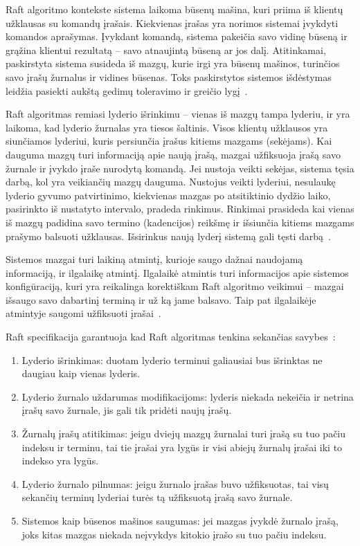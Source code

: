 \documentclass{VUMIFPSkursinis}
\begin{document}
Raft algoritmo kontekste sistema laikoma būsenų mašina, kuri priima iš klientų užklausas su komandų įrašais. Kiekvienas įrašas yra norimos sistemai įvykdyti komandos aprašymas. Įvykdant komandą, sistema pakeičia savo vidinę būseną ir grąžina klientui rezultatą -- savo atnaujintą būseną ar jos dalį. Atitinkamai, paskirstyta sistema susideda iš mazgų, kurie irgi yra būsenų mašinos, turinčios savo įrašų žurnalus ir vidines būsenas. Toks paskirstytos sistemos išdėstymas leidžia pasiekti aukštą gedimų toleravimo ir greičio lygį~\cite{ongaro_consensus, steen_distributed_2017}.

Raft algoritmas remiasi lyderio išrinkimu -- vienas iš mazgų tampa lyderiu, ir yra laikoma, kad lyderio žurnalas yra tiesos šaltinis. Visos klientų užklausos yra siunčiamos lyderiui, kuris persiunčia įrašus kitiems mazgams (sekėjams). Kai dauguma mazgų turi informaciją apie naują įrašą, mazgai užfiksuoja įrašą savo žurnale ir įvykdo įraše nurodytą komandą. Jei nustoja veikti sekėjas, sistema tęsia darbą, kol yra veikiančių mazgų dauguma. Nustojus veikti lyderiui, nesulaukę lyderio gyvumo patvirtinimo, kiekvienas mazgas po atsitiktinio dydžio laiko, pasirinkto iš nustatyto intervalo,  pradeda rinkimus. Rinkimai prasideda kai vienas iš mazgų padidina savo termino (kadencijos) reikšmę ir išsiunčia kitiems mazgams prašymo balsuoti užklausas. Išsirinkus naują lyderį sistemą gali tęsti darbą~\cite{ongaro_consensus}. 

Sistemos mazgai turi laikiną atmintį, kurioje saugo dažnai naudojamą informaciją, ir ilgalaikę atmintį. Ilgalaikė atmintis turi informacijos apie sistemos konfigūraciją, kuri yra reikalinga korektiškam Raft algoritmo veikimui -- mazgai išsaugo savo dabartinį terminą ir už ką jame balsavo. Taip pat ilgalaikėje atmintyje saugomi užfiksuoti įrašai~\cite{ongaro_consensus}.

Raft specifikacija garantuoja kad Raft algoritmas tenkina sekančias savybes~\cite{ongaro_consensus}: 

\begin{enumerate}
\item Lyderio išrinkimas: duotam lyderio terminui galiausiai bus išrinktas ne daugiau kaip vienas lyderis.
\item Lyderio žurnalo uždarumas modifikacijoms: lyderis niekada nekeičia ir netrina įrašų savo žurnale, jis gali tik pridėti naujų įrašų.
\item Žurnalų įrašų atitikimas: jeigu dviejų mazgų žurnalai turi įrašą su tuo pačiu indeksu ir terminu, tai tie įrašai yra lygūs ir visi abiejų žurnalų įrašai iki to indekso yra lygūs.
\item Lyderio žurnalo pilnumas: jeigu žurnalo įrašas buvo užfiksuotas, tai visų sekančių terminų lyderiai turės tą užfiksuotą įrašą savo žurnale.
\item Sistemos kaip būsenos mašinos saugumas: jei mazgas įvykdė žurnalo įrašą, joks kitas mazgas niekada neįvykdys kitokio įrašo su tuo pačiu indeksu.
\end{enumerate}
\end{document}
